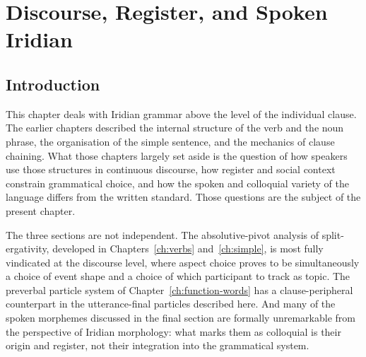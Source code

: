 \chapter{Discourse, Register, and Spoken Iridian}
\label{ch:discourse}\label{ch:spoken}\label{ch:semantics}


\section{Introduction}\label{sec:discourse-intro}

This chapter deals with Iridian grammar above the level of the individual
clause. The earlier chapters described the internal structure of the verb and
the noun phrase, the organisation of the simple sentence, and the mechanics of
clause chaining. What those chapters largely set aside is the question of how
speakers use those structures in continuous discourse, how register and social
context constrain grammatical choice, and how the spoken and colloquial variety
of the language differs from the written standard. Those questions are the
subject of the present chapter.

The three sections are not independent. The absolutive-pivot analysis of
split-ergativity, developed in Chapters~\ref{ch:verbs} and~\ref{ch:simple}, is
most fully vindicated at the discourse level, where aspect choice proves to be
simultaneously a choice of event shape and a choice of which participant to
track as topic. The preverbal particle system of Chapter~\ref{ch:function-words}
has a clause-peripheral counterpart in the utterance-final particles described
here. And many of the spoken morphemes discussed in the final section are
formally unremarkable from the perspective of Iridian morphology: what marks
them as colloquial is their origin and register, not their integration into the
grammatical system.

